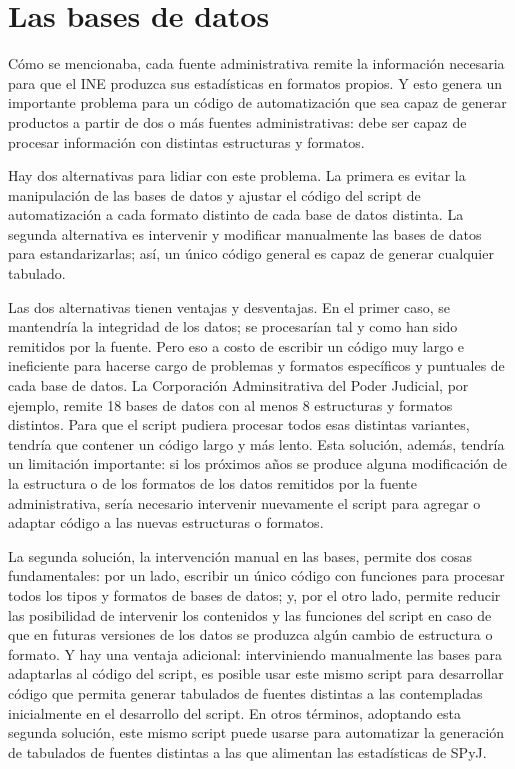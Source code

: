 \documentclass[
  spanish,
]{book}
\begin{document}
\hypertarget{las-bases-de-datos}{%
\chapter{Las bases de datos}\label{las-bases-de-datos}}

Cómo se mencionaba, cada fuente administrativa remite la información necesaria para que el INE produzca sus estadísticas en formatos propios. Y esto genera un importante problema para un código de automatización que sea capaz de generar productos a partir de dos o más fuentes administrativas: debe ser capaz de procesar información con distintas estructuras y formatos.

Hay dos alternativas para lidiar con este problema. La primera es evitar la manipulación de las bases de datos y ajustar el código del script de automatización a cada formato distinto de cada base de datos distinta. La segunda alternativa es intervenir y modificar manualmente las bases de datos para estandarizarlas; así, un único código general es capaz de generar cualquier tabulado.

Las dos alternativas tienen ventajas y desventajas. En el primer caso, se mantendría la integridad de los datos; se procesarían tal y como han sido remitidos por la fuente. Pero eso a costo de escribir un código muy largo e ineficiente para hacerse cargo de problemas y formatos específicos y puntuales de cada base de datos. La Corporación Adminsitrativa del Poder Judicial, por ejemplo, remite 18 bases de datos con al menos 8 estructuras y formatos distintos. Para que el script pudiera procesar todos esas distintas variantes, tendría que contener un código largo y más lento. Esta solución, además, tendría un limitación importante: si los próximos años se produce alguna modificación de la estructura o de los formatos de los datos remitidos por la fuente administrativa, sería necesario intervenir nuevamente el script para agregar o adaptar código a las nuevas estructuras o formatos.

La segunda solución, la intervención manual en las bases, permite dos cosas fundamentales: por un lado, escribir un único código con funciones para procesar todos los tipos y formatos de bases de datos; y, por el otro lado, permite reducir las posibilidad de intervenir los contenidos y las funciones del script en caso de que en futuras versiones de los datos se produzca algún cambio de estructura o formato. Y hay una ventaja adicional: interviniendo manualmente las bases para adaptarlas al código del script, es posible usar este mismo script para desarrollar código que permita generar tabulados de fuentes distintas a las contempladas inicialmente en el desarrollo del script. En otros términos, adoptando esta segunda solución, este mismo script puede usarse para automatizar la generación de tabulados de fuentes distintas a las que alimentan las estadísticas de SPyJ.
\end{document}
